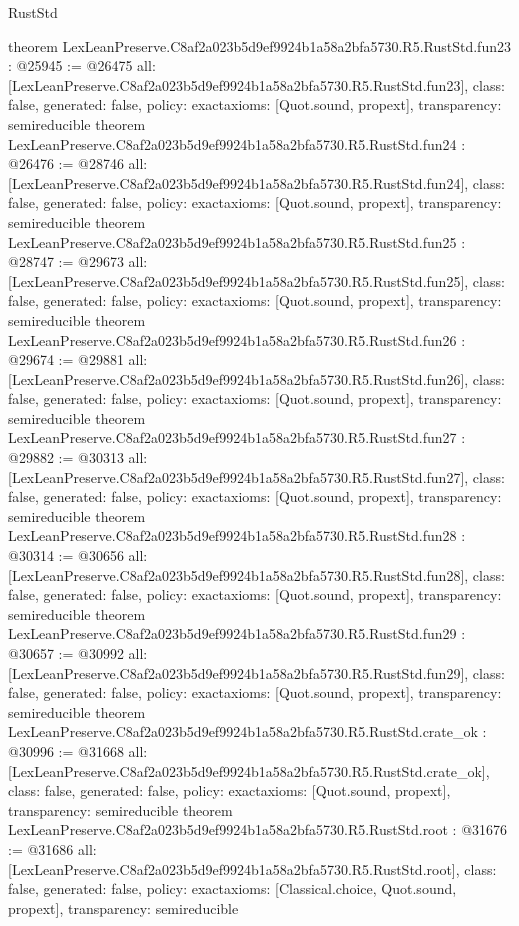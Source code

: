 \begin{lexlean}{RustStd}
\begin{coremodule}
{}
theorem LexLeanPreserve.C8af2a023b5d9ef9924b1a58a2bfa5730.R5.RustStd.fun23 : @25945 := @26475 {
  all: [LexLeanPreserve.C8af2a023b5d9ef9924b1a58a2bfa5730.R5.RustStd.fun23],
  class: false,
  generated: false,
  policy: exact{axioms: [Quot.sound, propext]},
  transparency: semireducible
}
theorem LexLeanPreserve.C8af2a023b5d9ef9924b1a58a2bfa5730.R5.RustStd.fun24 : @26476 := @28746 {
  all: [LexLeanPreserve.C8af2a023b5d9ef9924b1a58a2bfa5730.R5.RustStd.fun24],
  class: false,
  generated: false,
  policy: exact{axioms: [Quot.sound, propext]},
  transparency: semireducible
}
theorem LexLeanPreserve.C8af2a023b5d9ef9924b1a58a2bfa5730.R5.RustStd.fun25 : @28747 := @29673 {
  all: [LexLeanPreserve.C8af2a023b5d9ef9924b1a58a2bfa5730.R5.RustStd.fun25],
  class: false,
  generated: false,
  policy: exact{axioms: [Quot.sound, propext]},
  transparency: semireducible
}
theorem LexLeanPreserve.C8af2a023b5d9ef9924b1a58a2bfa5730.R5.RustStd.fun26 : @29674 := @29881 {
  all: [LexLeanPreserve.C8af2a023b5d9ef9924b1a58a2bfa5730.R5.RustStd.fun26],
  class: false,
  generated: false,
  policy: exact{axioms: [Quot.sound, propext]},
  transparency: semireducible
}
theorem LexLeanPreserve.C8af2a023b5d9ef9924b1a58a2bfa5730.R5.RustStd.fun27 : @29882 := @30313 {
  all: [LexLeanPreserve.C8af2a023b5d9ef9924b1a58a2bfa5730.R5.RustStd.fun27],
  class: false,
  generated: false,
  policy: exact{axioms: [Quot.sound, propext]},
  transparency: semireducible
}
theorem LexLeanPreserve.C8af2a023b5d9ef9924b1a58a2bfa5730.R5.RustStd.fun28 : @30314 := @30656 {
  all: [LexLeanPreserve.C8af2a023b5d9ef9924b1a58a2bfa5730.R5.RustStd.fun28],
  class: false,
  generated: false,
  policy: exact{axioms: [Quot.sound, propext]},
  transparency: semireducible
}
theorem LexLeanPreserve.C8af2a023b5d9ef9924b1a58a2bfa5730.R5.RustStd.fun29 : @30657 := @30992 {
  all: [LexLeanPreserve.C8af2a023b5d9ef9924b1a58a2bfa5730.R5.RustStd.fun29],
  class: false,
  generated: false,
  policy: exact{axioms: [Quot.sound, propext]},
  transparency: semireducible
}
theorem LexLeanPreserve.C8af2a023b5d9ef9924b1a58a2bfa5730.R5.RustStd.crate_ok : @30996 := @31668 {
  all: [LexLeanPreserve.C8af2a023b5d9ef9924b1a58a2bfa5730.R5.RustStd.crate_ok],
  class: false,
  generated: false,
  policy: exact{axioms: [Quot.sound, propext]},
  transparency: semireducible
}
theorem LexLeanPreserve.C8af2a023b5d9ef9924b1a58a2bfa5730.R5.RustStd.root : @31676 := @31686 {
  all: [LexLeanPreserve.C8af2a023b5d9ef9924b1a58a2bfa5730.R5.RustStd.root],
  class: false,
  generated: false,
  policy: exact{axioms: [Classical.choice, Quot.sound, propext]},
  transparency: semireducible
}


\end{coremodule}
\end{lexlean}
